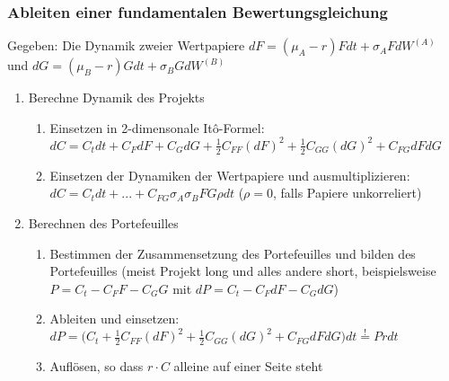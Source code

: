 \subsubsection{Ableiten einer fundamentalen Bewertungsgleichung}
Gegeben: Die Dynamik zweier Wertpapiere \(dF = (\mu_A-r)Fdt+\sigma_AFdW^{(A)}\) und \(dG = (\mu_B-r)Gdt+\sigma_BGdW^{(B)}\)
\begin{enumerate}
	\item Berechne Dynamik des Projekts
	\begin{enumerate}
		\item Einsetzen in 2-dimensonale Itô-Formel: \(dC = C_tdt + C_FdF + C_GdG + \frac{1}{2}C_{FF}(dF)^2 + \frac{1}{2}C_{GG}(dG)^2 + C_{FG}dFdG\)
		\item Einsetzen der Dynamiken der Wertpapiere und ausmultiplizieren: \(dC = C_tdt + ... + C_{FG}\sigma_A\sigma_BFG\rho dt\) (\(\rho=0\), falls Papiere unkorreliert)
	\end{enumerate}
	\item Berechnen des Portefeuilles
	\begin{enumerate}
		\item Bestimmen der Zusammensetzung des Portefeuilles und bilden des Portefeuilles (meist Projekt long und alles andere short, beispielsweise \(P = C_t-C_FF-C_GG\) mit \(dP = C_t-C_FdF-C_GdG\))
		\item Ableiten und einsetzen: \(dP = \Big(C_t + \frac{1}{2}C_{FF}(dF)^2 + \frac{1}{2}C_{GG}(dG)^2 + C_{FG}dFdG\Big)dt \stackrel{!}{=} Prdt\)
		\item Auflösen, so dass \(r\cdot C\) alleine auf einer Seite steht
	\end{enumerate}
\end{enumerate}
